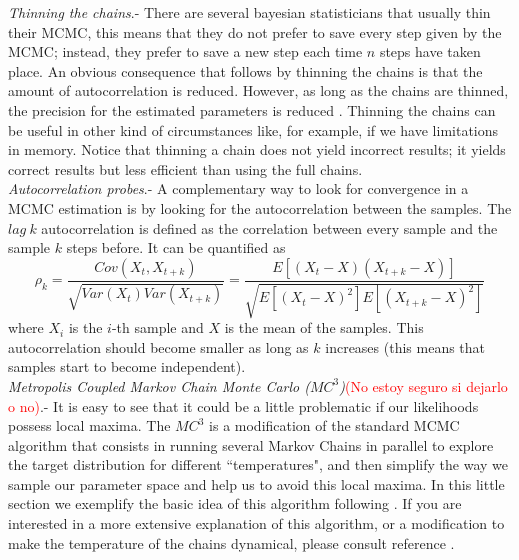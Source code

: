 \documentclass[onecolumn,           %
               showpacs,            %
               preprintnumbers,     %
               aps,                 %
               letterpaper,             %
               superscriptaddress,      %
               nofootinbib,         %
               tightenlines,        %
               floats,floatfix      %
               ,usenatbib,
               ]{revtex4-1}
\begin{document}
 \textit{Thinning the chains}.- There are several bayesian statisticians that usually thin their MCMC, this means that they do not prefer to save every step given by the MCMC; instead, they prefer to save a new step each time $n$ steps have taken place. An obvious consequence that follows by thinning the chains is that the amount of autocorrelation is reduced. However, as long as the chains are thinned, the precision for the estimated parameters is reduced \cite{thin}. Thinning the chains can be useful in other kind of circumstances like, for example, if we have limitations in memory. Notice that thinning a chain does not yield incorrect results; it yields correct results but less efficient than using the full chains.       
\\

\textit{Autocorrelation probes}.- A complementary way to look for convergence in a MCMC estimation is by looking for the autocorrelation between the samples. The $lag\ k$ autocorrelation is defined as the correlation between every sample and the sample $k$ steps before. It can be quantified as \cite{autocor}
\begin{equation}
\rho_k=\frac{Cov(X_t,X_{t+k})}{\sqrt{Var(X_t)Var(X_{t+k})}}=\frac{E[(X_t-X)(X_{t+k}-X)]}{\sqrt{E[(X_t-X)^2]E[(X_{t+k}-X)^2]}}
\end{equation}
where $X_i$ is the $i$-th sample and $X$ is the mean of the samples. This autocorrelation should become smaller as long as $k$ increases (this means that samples start to become independent).\\

\textit{Metropolis Coupled Markov Chain Monte Carlo ($MC^3$)}\textcolor{red}{(No estoy seguro si dejarlo o no)}.- It is easy to see that it could be a little problematic if our likelihoods possess local maxima. The $MC^3$ is a modification of the standard MCMC algorithm that consists in running several Markov Chains in parallel to explore the target distribution for different  ``temperatures", and then simplify the way we sample our parameter space and help us to avoid this local maxima. In this little section we exemplify the basic idea of this algorithm following \cite{mcmcmc}. If you are interested in a more extensive explanation of this algorithm, or a modification to make the temperature of the chains dynamical, please consult reference \cite{mcmcmc}.
\end{document}
